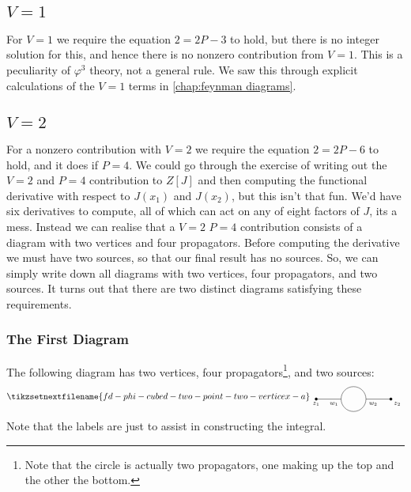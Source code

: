 \documentclass[fleqn]{NotesClass}
\begin{document}
    \subsection{\texorpdfstring{\(V = 1\)}{V = 1}}
    For \(V = 1\) we require the equation \(2 = 2P - 3\) to hold, but there is no integer solution for this, and hence there is no nonzero contribution from \(V = 1\).
    This is a peculiarity of \(\varphi^3\) theory, not a general rule.
    We saw this through explicit calculations of the \(V = 1\) terms in \cref{chap:feynman diagrams}.
    
    \subsection{\texorpdfstring{\(V = 2\)}{V = 2}}
    For a nonzero contribution with \(V = 2\) we require the equation \(2 = 2P - 6\) to hold, and it does if \(P = 4\).
    We could go through the exercise of writing out the \(V = 2\) and \(P = 4\) contribution to \(Z[J]\) and then computing the functional derivative with respect to \(J(x_1)\) and \(J(x_2)\), but this isn't that fun.
    We'd have six derivatives to compute, all of which can act on any of eight factors of \(J\), its a mess.
    Instead we can realise that a \(V = 2\) \(P = 4\) contribution consists of a diagram with two vertices and four propagators.
    Before computing the derivative we must have two sources, so that our final result has no sources.
    So, we can simply write down all diagrams with two vertices, four propagators, and two sources.
    It turns out that there are two distinct diagrams satisfying these requirements.
    
    \subsubsection{The First Diagram}
    The following diagram has two vertices, four propagators\footnote{Note that the circle is actually two propagators, one making up the top and the other the bottom.}, and two sources:
    \begin{equation}
        \tikzsetnextfilename{fd-phi-cubed-two-point-two-verticex-a}
        \begin{tikzpicture}[baseline=(current bounding box)]
            \draw (-1.5, 0) node[below] {\scriptsize\(z_1\)} -- (-0.5, 0) node[below left, xshift=0.3] {\scriptsize\(w_1\)};
            \draw (0.5, 0) node[below right, xshift=-0.2] {\scriptsize\(w_2\)} -- (1.5, 0) node[below right] {\scriptsize\(z_2\)};
            \draw (0, 0) circle [radius = 0.5];
            \draw[fill] (-1.5, 0) circle [radius = 0.05];
            \draw[fill] (1.5, 0) circle [radius = 0.05];
        \end{tikzpicture}
    \end{equation}
    Note that the labels are just to assist in constructing the integral.
    
\end{document}
